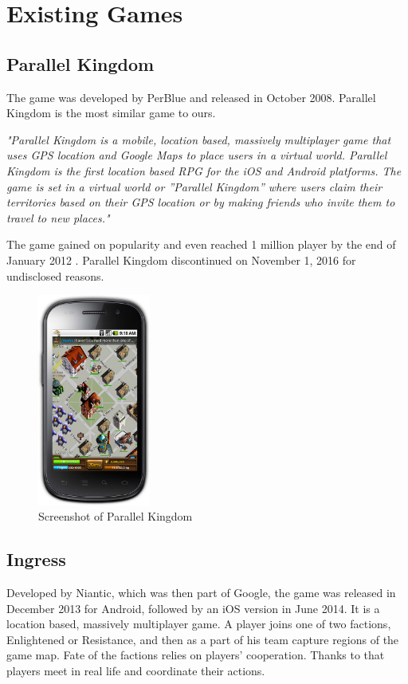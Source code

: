 
\section{Existing Games}

	\subsection{Parallel Kingdom}
	The game was developed by PerBlue and released in October 2008. Parallel Kingdom is the most similar game to ours.
		
	\textit{"Parallel Kingdom is a mobile, location based, massively multiplayer game that uses GPS location and Google Maps to place users in a virtual world. Parallel Kingdom is the first location based RPG for the iOS and Android platforms. The game is set in a virtual world or ”Parallel Kingdom” where users claim their territories based on their GPS location or by making friends who invite them to travel to new places."} \cite{parallelkingdom}
	
	The game gained on popularity and even reached 1 million player by the end of January 2012 \cite{parallelkingdom1m}. Parallel Kingdom discontinued on November 1, 2016 for undisclosed reasons.
	
	\begin{figure}[h]	
		\includegraphics[width=0.33\textwidth]{figures/parallelkingdom}
		\centering			
		\caption{Screenshot of Parallel Kingdom \cite{parallelkingdomscreen}}
	\end{figure}
	
	\subsection{Ingress}
	Developed by Niantic, which was then part of Google, the game was released in December 2013 for Android, followed by an iOS version in June 2014. It is a location based, massively multiplayer game. A player joins one of two factions, Enlightened or Resistance, and then as a part of his team capture regions of the game map. Fate of the factions relies on players’ cooperation. Thanks to that players meet in real life and coordinate their actions.
	
